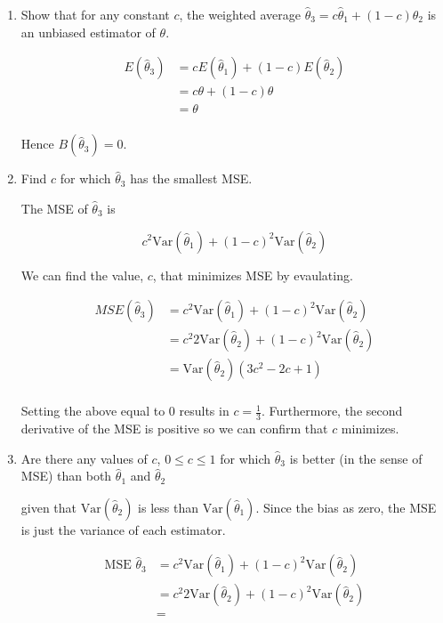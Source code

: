\documentclass{tufte-book}
\newcommand{\Var}{\mathrm{Var}}
\theoremstyle{mytheoremstyle}
\theoremstyle{mylemstyle}
\theoremstyle{mydefstyle}
\begin{document}
\begin{enumerate}

\item Show that for any constant $c$, the weighted average $\hat{\theta}_3 = c\hat{\theta}_1 + (1-c)\hat{\theta}_2$ is an unbiased estimator of $\theta$.

\begin{align*}
E(\hat{\theta}_3) &= cE(\hat{\theta}_1) + (1-c)E(\hat{\theta}_2)\\
&= c\theta + (1-c)\theta\\
&= \theta\\
\end{align*}

Hence $B(\hat{\theta}_3) = 0$.

\item Find $c$ for which $\hat{\theta}_3$ has the smallest MSE.

The MSE of $\hat{\theta}_3$ is

\[ c^2\Var(\hat{\theta}_1) + (1-c)^2\Var(\hat{\theta}_2) \]

We can find the value, $c$, that minimizes MSE by evaulating.

\begin{align*}
MSE(\hat{\theta}_3) &= c^2\Var(\hat{\theta}_1) + (1-c)^2\Var(\hat{\theta}_2)\\
&=c^2 2\Var(\hat{\theta}_2) + (1-c)^2\Var(\hat{\theta}_2)\\
&=\Var(\hat{\theta}_2)(3c^2 - 2c + 1)\\
\end{align*}

Setting the above equal to $0$ results in $c=\frac{1}{3}$.  Furthermore, the second derivative of the MSE is positive so we can confirm that $c$ minimizes.

\item Are there any values of $c$, $0 \leq c \leq 1$ for which $\hat{\theta}_3$ is better (in the sense of MSE) than both $\hat{\theta}_1$ and $\hat{\theta}_2$

 given that $\Var(\hat{\theta}_2)$ is less than $\Var(\hat{\theta}_1)$.  Since the bias as zero, the MSE is just the variance of each estimator.

\begin{align*}
\text{MSE }\hat{\theta}_3 &= c^2\Var(\hat{\theta}_1) + (1-c)^2\Var(\hat{\theta}_2)\\
&= c^2 2\Var(\hat{\theta}_2) + (1-c)^2\Var(\hat{\theta}_2)\\
&=
\end{align*}

\end{enumerate}
\end{document}

